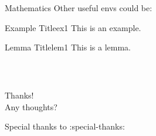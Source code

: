 \documentclass[xcolor=dvipsnames,t,aspectratio=169]{beamer} %
\newcommand{\highlight}[1]{{\color{fgv_light_blue} #1}}
\begin{document}
\begin{frame}[c]{Mathematics}
    Other useful envs could be:

    \begin{ex}{Example Title}{ex1}
        This is an example.
    \end{ex}

    \begin{lem}{Lemma Title}{lem1}
        This is a lemma.
    \end{lem}

\end{frame}

\begin{frame}
    \frametitle{~}
        \vfill
        \begin{center}
            {\Huge Thanks!}\vspace{1.5em}\\
            {\Large \highlight{Any thoughts?}}\\
        \end{center}
        \vfill
        \begin{center}
            {\small Special thanks to :special-thanks:}
        \end{center}
    \end{frame}
\end{document}

